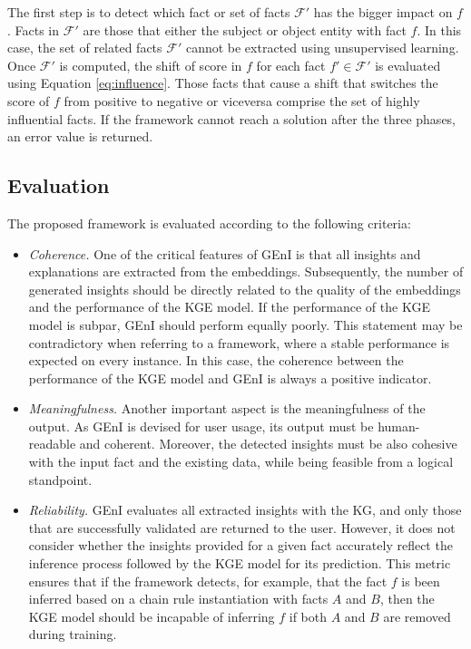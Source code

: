 The first step is to detect which fact or set of facts $\mathcal{F}'$ has the bigger impact on $f$. Facts in $\mathcal{F}'$ are those that either the subject or object entity with fact $f$. In this case, the set of related facts $\mathcal{F}'$ cannot be extracted using unsupervised learning. Once $\mathcal{F}'$ is computed, the shift of score in $f$ for each fact $f' \in \mathcal{F}'$ is evaluated using Equation \ref{eq:influence}. Those facts that cause a shift that switches the score of $f$ from positive to negative or viceversa comprise the set of highly influential facts. If the framework cannot reach a solution after the three phases, an error value is returned. 

\subsection{Evaluation}\label{6_sec:subsec:geni_evaluation}
The proposed framework is evaluated according to the following criteria:
\begin{itemize}
    \item \textit{Coherence.} One of the critical features of GEnI is that all insights and explanations are extracted from the embeddings. Subsequently, the number of generated insights should be directly related to the quality of the embeddings and the performance of the KGE model. If the performance of the KGE model is subpar, GEnI should perform equally poorly. This statement may be contradictory when referring to a framework, where a stable performance is expected on every instance. In this case, the coherence between the performance of the KGE model and GEnI is always a positive indicator.
    
    \item \textit{Meaningfulness.} Another important aspect is the meaningfulness of the output. As GEnI is devised for user usage, its output must be human-readable and coherent. Moreover, the detected insights must be also cohesive with the input fact and the existing data, while being feasible from a logical standpoint.
    
    \item \textit{Reliability.} GEnI evaluates all extracted insights with the KG, and only those that are successfully validated are returned to the user. However, it does not consider whether the insights provided for a given fact accurately reflect the inference process followed by the KGE model for its prediction. This metric ensures that if the framework detects, for example, that the fact $f$ is been inferred based on a chain rule instantiation with facts $A$ and $B$, then the KGE model should be incapable of inferring $f$ if both $A$ and $B$ are removed during training.
\end{itemize}

